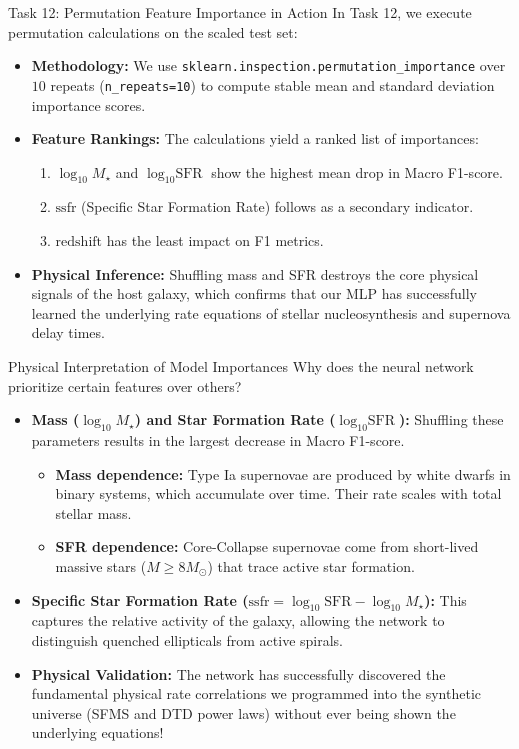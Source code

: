 \documentclass[9pt]{beamer}
\begin{document}
\begin{frame}{Task 12: Permutation Feature Importance in Action}
  In Task 12, we execute permutation calculations on the scaled test set:
  \begin{itemize}
    \item \textbf{Methodology:} We use \texttt{sklearn.inspection.permutation\_importance} over $10$ repeats (\texttt{n\_repeats=10}) to compute stable mean and standard deviation importance scores.
    \item \textbf{Feature Rankings:} The calculations yield a ranked list of importances:
      \begin{enumerate}
        \item $\log_{10} M_\star$ and $\log_{10} \text{SFR}$ show the highest mean drop in Macro F1-score.
        \item $\text{ssfr}$ (Specific Star Formation Rate) follows as a secondary indicator.
        \item $\text{redshift}$ has the least impact on F1 metrics.
      \end{enumerate}
    \item \textbf{Physical Inference:} Shuffling mass and SFR destroys the core physical signals of the host galaxy, which confirms that our MLP has successfully learned the underlying rate equations of stellar nucleosynthesis and supernova delay times.
  \end{itemize}
\end{frame}

\begin{frame}{Physical Interpretation of Model Importances}
  Why does the neural network prioritize certain features over others?
  \begin{itemize}
    \item \textbf{Mass ($\log_{10} M_\star$) and Star Formation Rate ($\log_{10} \text{SFR}$):}
      Shuffling these parameters results in the largest decrease in Macro F1-score.
      \begin{itemize}
        \item \textbf{Mass dependence:} Type Ia supernovae are produced by white dwarfs in binary systems, which accumulate over time. Their rate scales with total stellar mass.
        \item \textbf{SFR dependence:} Core-Collapse supernovae come from short-lived massive stars ($M \ge 8 M_\odot$) that trace active star formation.
      \end{itemize}
    \item \textbf{Specific Star Formation Rate ($\text{ssfr} = \log_{10} \text{SFR} - \log_{10} M_\star$):}
      This captures the relative activity of the galaxy, allowing the network to distinguish quenched ellipticals from active spirals.
    \item \textbf{Physical Validation:}
      The network has successfully discovered the fundamental physical rate correlations we programmed into the synthetic universe (SFMS and DTD power laws) without ever being shown the underlying equations!
  \end{itemize}
\end{frame}
\end{document}
